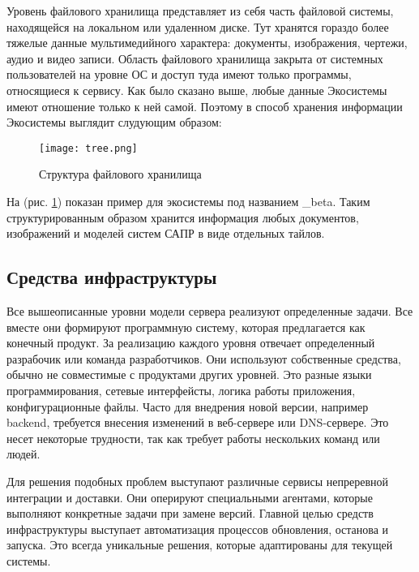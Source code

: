 Уровень файлового хранилища представляет из себя часть файловой системы, находящейся на локальном или удаленном диске. Тут хранятся гораздо более тяжелые данные мультимедийного характера: документы, изображения, чертежи, аудио и видео записи. Область файлового хранилища закрыта от системных пользователей на уровне ОС и доступ туда имеют только программы, относящиеся к сервису. Как было сказано выше, любые данные Экосистемы имеют отношение только к ней самой. Поэтому в способ хранения информации Экосистемы выглядит слудующим образом:
\begin{figure}[H]
\texttt{[image: tree.png]}
\caption{Структура файлового хранилища}
\label{img:tree}
\end{figure}

На (рис. \ref{img:tree}) показан пример для экосистемы под названием {\ttfamily \_beta}. Таким структурированным образом хранится информация любых документов, изображений и моделей систем САПР в виде отдельных тайлов.

\subsection{Средства инфраструктуры}

Все вышеописанные уровни модели сервера реализуют определенные задачи. Все вместе они формируют программную систему, которая предлагается как конечный продукт. За реализацию каждого уровня отвечает определенный разрабочик или команда разработчиков. Они используют собственные средства, обычно не совместимые с продуктами других уровней. Это разные языки программирования, сетевые интерфейсты, логика работы приложения, конфигурационные файлы. Часто для внедрения новой версии, например backend, требуется внесения изменений в веб-сервере или DNS-сервере. Это несет некоторые трудности, так как требует работы нескольких команд или людей. 

Для решения подобных проблем выступают различные сервисы непреревной интеграции и доставки. Они оперируют специальными агентами, которые выполняют конкретные задачи при замене версий. Главной целью средств инфраструктуры выступает автоматизация процессов обновления, останова и запуска. Это всегда уникальные решения, которые адаптированы для текущей системы.